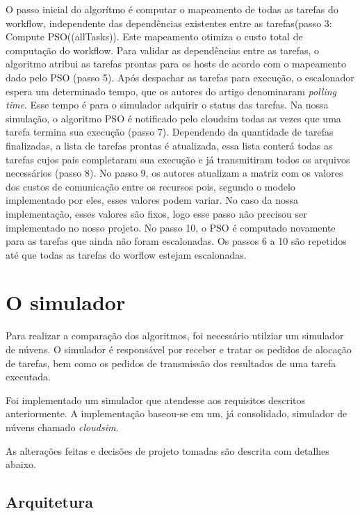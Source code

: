 \documentclass[a4paper,10pt]{article}
\begin{document}
O passo inicial do algorítmo é computar o mapeamento de todas as tarefas do workflow, independente das dependências
existentes entre as tarefas(passo 3: Compute PSO((allTasks)). Este mapeamento otimiza o custo total de computação do workflow. 
Para validar as dependências entre as tarefas, o algoritmo atribui as tarefas prontas para os hosts de acordo com o 
mapeamento dado pelo PSO (passo 5). Após despachar as tarefas para execução, o escalonador espera um determinado tempo, que
os autores do artigo denominaram \emph{polling time}. Esse tempo é para o simulador adquirir o status das tarefas.
Na nossa simulação, o algoritmo PSO é notificado pelo cloudsim todas as vezes que uma tarefa termina sua execução (passo 7).
Dependendo da quantidade de tarefas finalizadas, a lista de tarefas prontas é atualizada, essa lista conterá todas as tarefas 
cujos pais completaram sua execução e já transmitiram todos os arquivos necessários (passo 8). No passo 9, os autores 
atualizam a matriz com os valores dos custos de comunicação entre os recursos pois, segundo o modelo implementado por eles, 
esses valores podem variar. No caso da nossa implementação, esses valores são fixos, logo esse passo não precisou ser implementado 
no nosso projeto. No passo 10, o PSO é computado novamente para as tarefas que ainda não foram escalonadas. Os passos 6 a 10 
são repetidos até que todas as tarefas do worflow estejam escalonadas.\\

\section{O simulador}

Para realizar a comparação dos algoritmos, foi necessário utilziar um simulador de núvens. O simulador é
responsável por receber e tratar os pedidos de alocação de tarefas, bem como os pedidos de transmissão dos
resultados de uma tarefa executada.

Foi implementado um simulador que atendesse aos requisitos descritos anteriormente. A implementação baseou-se
em um, já consolidado, simulador de núvens chamado \emph{cloudsim}\cite{cloudsim}.

As alterações feitas e decisões de projeto tomadas são descrita com detalhes abaixo.

\subsection{Arquitetura}
\end{document}
